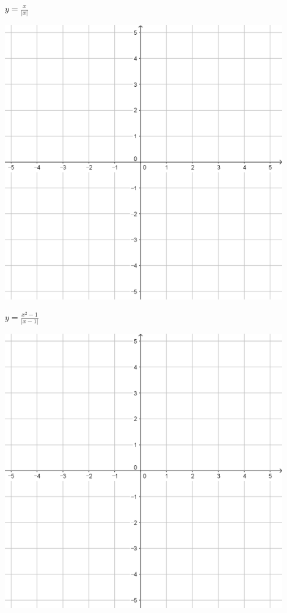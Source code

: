 \documentclass[a4paper]{oblivoir}
\begin{document}
\begin{minipage}{0.45\textwidth}\centering
\(y=\frac{x}{|x|}\)
\par\bigskip\includegraphics[width=0.9\textwidth]{55}
\end{minipage}
\begin{minipage}{0.45\textwidth}\centering
\(y=\frac{x^2-1}{|x-1|}\)
\par\bigskip\includegraphics[width=0.9\textwidth]{55}
\end{minipage}\bigskip\bigskip\par
\end{document}
